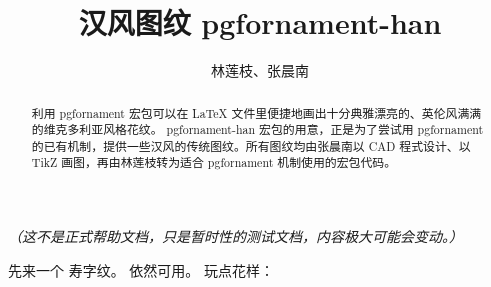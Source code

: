 \documentclass{ctexart}
\title{汉风图纹 pgfornament-han}
\author{林莲枝、张晨南}
\begin{document}
\maketitle

\begin{abstract}
利用 pgfornament 宏包可以在 \LaTeX{} 文件里便捷地画出十分典雅漂亮的、英伦风满满的维克多利亚风格花纹。 pgfornament-han 宏包的用意，正是为了尝试用 pgfornament 的已有机制，提供一些汉风的传统图纹。所有图纹均由张晨南以 CAD 程式设计、以 TikZ 画图，再由林莲枝转为适合 pgfornament 机制使用的宏包代码。
\end{abstract}

\emph{（这不是正式帮助文档，只是暂时性的测试文档，内容极大可能会变动。）}

先来一个  寿字纹。 依然可用。
%
%
玩点花样：
%
\end{document}
